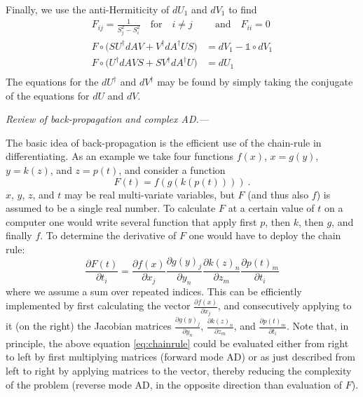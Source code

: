 \documentclass[twocolumn,floatfix,superscriptaddress,longbibliography,pra]{revtex4-2}
\renewcommand{\section}[1]{\emph{#1.---}}
\begin{document}
Finally, we use the anti-Hermiticity of $dU_1$ and $dV_1$ to find
\begin{align}
    F_{ij}=\frac{1}{S_j^2-S_i^2}\quad \text{for}\quad i\neq j&\quad \text{and}\quad    F_{ii}=0\\
    F\circ\big(SU^\dagger dAV+V^\dagger dA^\dagger US\big)&=dV_1-\mathbb{1}\circ dV_1\\
    F\circ\big(U^\dagger dAVS+SV^\dagger dA^\dagger U\big)&=dU_1\\
\end{align}
The equations for the $dU^\dagger$ and $dV^\dagger$ may be found by simply taking the conjugate of the equations for $dU$ and $dV$.


\section{Review of back-propagation and complex AD}


The basic idea of back-propagation is the efficient use of the chain-rule in differentiating. As an example we take four functions $f(x)$, $x=g(y)$, $y=k(z)$, and $z=p(t)$, and 
consider a function
\begin{equation}
    F(t)=f(g(k(p(t))))\ .
\end{equation}
$x$, $y$, $z$, and $t$ may be real multi-variate variables, but $F$ (and thus also $f$) is assumed to be a single real number. To calculate $F$ at a certain value of $t$ on a computer one would write several function that apply first $p$, then $k$, then $g$, and finally $f$. To determine the derivative of $F$ one would have to deploy the chain rule:
\begin{equation}
    \frac{\partial F(t)}{\partial t_i}=\frac{\partial f(x)}{\partial x_j}\frac{\partial g(y)_j}{\partial y_n}\frac{\partial k(z)_n}{\partial z_m}\frac{\partial p(t)_m}{\partial t_i}\label{eq:chainrule}
\end{equation}
where we assume a sum over repeated indices. This can be efficiently implemented by first calculating the vector $\frac{\partial f(x)}{\partial x_j}$, and consecutively applying to it (on the right) the Jacobian matrices $\frac{\partial g(y)_j}{\partial y_n}$, $\frac{\partial k(z)_n}{\partial z_m}$, and $\frac{\partial p(t)_m}{\partial t_i}$.  
Note that, in principle, the above equation \eqref{eq:chainrule} could be evaluated either from right to left  by first multiplying matrices 
(forward mode AD) or as just described from left to right by applying matrices to the vector, thereby reducing the complexity of the problem
(reverse mode AD, in the opposite direction than evaluation of $F$).
\end{document}
